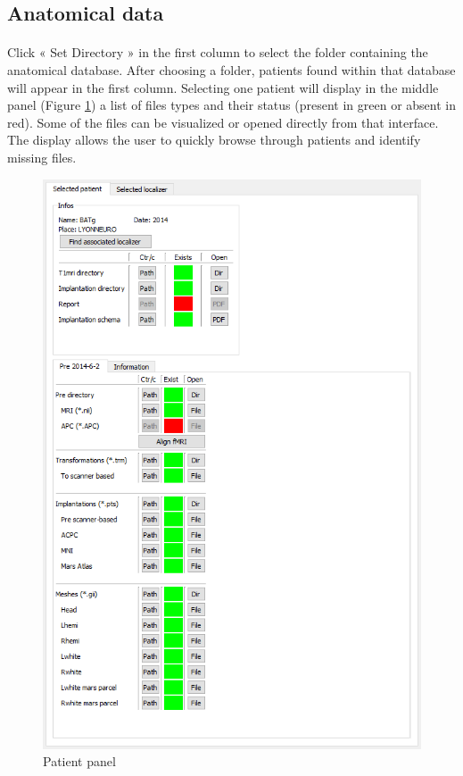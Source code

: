\documentclass[a4paper]{article}
\begin{document}
\subsection{Anatomical data}
\paragraph{} Click « Set Directory » in the first column to select the folder containing the anatomical database. After choosing a folder, patients found within that database will appear in the first column. Selecting one patient will display in the middle panel (Figure \ref{dbManagerPatient}) a list of files types and their status (present in green or absent in red). Some of the files can be visualized or opened directly from that interface. The display allows the user to quickly browse through patients and identify missing files.
\begin{figure}[H]
\begin{center}
\includegraphics[scale=0.5]{DBManagerPatient.png}
\end{center}
\caption{\label{dbManagerPatient}Patient panel}
\end{figure}
\end{document}
